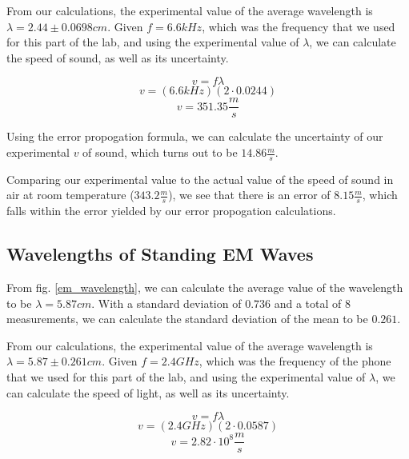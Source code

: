 \documentclass{article}
\begin{document}
From our calculations, the experimental value of the average wavelength is
$\lambda = 2.44\pm 0.0698 cm$. Given $f=6.6kHz$, which was the frequency that we
used for this part of the lab, and using the experimental value of $\lambda$, we
can calculate the speed of sound, as well as its uncertainty.

\begin{equation}
    \label{vflambda}
    v = f\lambda
\end{equation}
\begin{equation}
    \label{vflambda_sound1}
    v = (6.6kHz)(2\cdot0.0244)
\end{equation}
\begin{equation}
    \label{vflambda_sound2}
    v = 351.35 \frac{m}{s}
\end{equation}

Using the error propogation formula, we can calculate the uncertainty of our
experimental $v$ of sound, which turns out to be $14.86\frac{m}{s}$.

Comparing our experimental value to the actual value of the speed of sound in
air at room temperature ($343.2\frac{m}{s}$), we see that there is an error of
$8.15\frac{m}{s}$, which falls within the error yielded by our error propogation
calculations.

\subsection{Wavelengths of Standing EM Waves}

From fig. \ref{em_wavelength}, we can calculate the average value of
the wavelength to be $\lambda = 5.87cm$. With a standard deviation of $0.736$
and a total of $8$ measurements, we can calculate the standard deviation of the
mean to be $0.261$.

From our calculations, the experimental value of the average wavelength is
$\lambda = 5.87\pm 0.261 cm$. Given $f=2.4GHz$, which was the frequency of the
phone that we used for this part of the lab, and using the experimental value of
$\lambda$, we can calculate the speed of light, as well as its uncertainty.

\begin{equation}
    v = f\lambda
\end{equation}
\begin{equation}
    \label{vflambda_em1}
    v = (2.4GHz)(2\cdot0.0587)
\end{equation}
\begin{equation}
    \label{vflambda_em2}
    v = 2.82 \cdot 10^{8} \frac{m}{s}
\end{equation}
\end{document}
